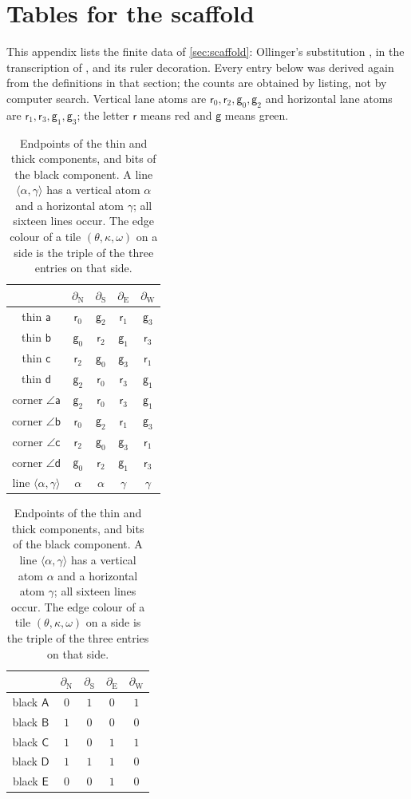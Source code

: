 \section{Tables for the scaffold}\label{app:tables}

This appendix lists the finite data of \cref{sec:scaffold}: Ollinger's substitution \cite{Ollinger08}, in the transcription of \cite{LeanWang}, and its ruler decoration. Every entry below was derived again from the definitions in that section; the counts are obtained by listing, not by computer search. Vertical lane atoms are $\mathsf r_0,\mathsf r_2,\mathsf g_0,\mathsf g_2$ and horizontal lane atoms are $\mathsf r_1,\mathsf r_3,\mathsf g_1,\mathsf g_3$; the letter $\mathsf r$ means red and $\mathsf g$ means green.

\begin{table}[ht]
\centering
\begin{tabular}{c|cccc}
 & $\partial_{\mathrm N}$ & $\partial_{\mathrm S}$ & $\partial_{\mathrm E}$ & $\partial_{\mathrm W}$\\\hline
thin $\mathsf a$ & $\mathsf r_0$ & $\mathsf g_2$ & $\mathsf r_1$ & $\mathsf g_3$\\
thin $\mathsf b$ & $\mathsf g_0$ & $\mathsf r_2$ & $\mathsf g_1$ & $\mathsf r_3$\\
thin $\mathsf c$ & $\mathsf r_2$ & $\mathsf g_0$ & $\mathsf g_3$ & $\mathsf r_1$\\
thin $\mathsf d$ & $\mathsf g_2$ & $\mathsf r_0$ & $\mathsf r_3$ & $\mathsf g_1$\\\hline
corner $\angle\mathsf a$ & $\mathsf g_2$ & $\mathsf r_0$ & $\mathsf r_3$ & $\mathsf g_1$\\
corner $\angle\mathsf b$ & $\mathsf r_0$ & $\mathsf g_2$ & $\mathsf r_1$ & $\mathsf g_3$\\
corner $\angle\mathsf c$ & $\mathsf r_2$ & $\mathsf g_0$ & $\mathsf g_3$ & $\mathsf r_1$\\
corner $\angle\mathsf d$ & $\mathsf g_0$ & $\mathsf r_2$ & $\mathsf g_1$ & $\mathsf r_3$\\\hline
line $\langle\alpha,\gamma\rangle$ & $\alpha$ & $\alpha$ & $\gamma$ & $\gamma$
\end{tabular}
\qquad
\begin{tabular}{c|cccc}
 & $\partial_{\mathrm N}$ & $\partial_{\mathrm S}$ & $\partial_{\mathrm E}$ & $\partial_{\mathrm W}$\\\hline
black $\mathsf A$ & $0$ & $1$ & $0$ & $1$\\
black $\mathsf B$ & $1$ & $0$ & $0$ & $0$\\
black $\mathsf C$ & $1$ & $0$ & $1$ & $1$\\
black $\mathsf D$ & $1$ & $1$ & $1$ & $0$\\
black $\mathsf E$ & $0$ & $0$ & $1$ & $0$
\end{tabular}
\caption{Endpoints of the thin and thick components, and bits of the black component. A line $\langle\alpha,\gamma\rangle$ has a vertical atom $\alpha$ and a horizontal atom $\gamma$; all sixteen lines occur. The edge colour of a tile $(\theta,\kappa,\omega)$ on a side is the triple of the three entries on that side.}
\label{scf:tab-edges}
\end{table}

